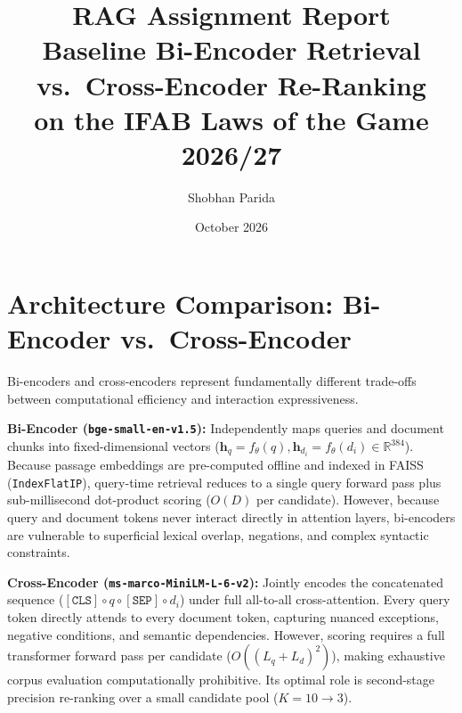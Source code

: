 \documentclass[11pt,a4paper]{article}
\title{%
    \textbf{RAG Assignment Report}\\[0.4em]
    \large Baseline Bi-Encoder Retrieval vs.\ Cross-Encoder Re-Ranking\\
    on the IFAB Laws of the Game 2026/27
}
\author{Shobhan Parida}
\date{October 2026}
\begin{document}
\maketitle

\section{Architecture Comparison: Bi-Encoder vs.\ Cross-Encoder}
\label{sec:architecture}

Bi-encoders and cross-encoders represent fundamentally different trade-offs between computational efficiency and interaction expressiveness.

\textbf{Bi-Encoder (\texttt{bge-small-en-v1.5}):} Independently maps queries and document chunks into fixed-dimensional vectors ($\mathbf{h}_q = f_\theta(q), \mathbf{h}_{d_i} = f_\theta(d_i) \in \mathbb{R}^{384}$). Because passage embeddings are pre-computed offline and indexed in FAISS (\texttt{IndexFlatIP}), query-time retrieval reduces to a single query forward pass plus sub-millisecond dot-product scoring ($O(D)$ per candidate). However, because query and document tokens never interact directly in attention layers, bi-encoders are vulnerable to superficial lexical overlap, negations, and complex syntactic constraints.

\textbf{Cross-Encoder (\texttt{ms-marco-MiniLM-L-6-v2}):} Jointly encodes the concatenated sequence ($[\texttt{CLS}] \circ q \circ [\texttt{SEP}] \circ d_i$) under full all-to-all cross-attention. Every query token directly attends to every document token, capturing nuanced exceptions, negative conditions, and semantic dependencies. However, scoring requires a full transformer forward pass per candidate ($O((L_q + L_d)^2)$), making exhaustive corpus evaluation computationally prohibitive. Its optimal role is second-stage precision re-ranking over a small candidate pool ($K{=}10 \to 3$).
\end{document}
